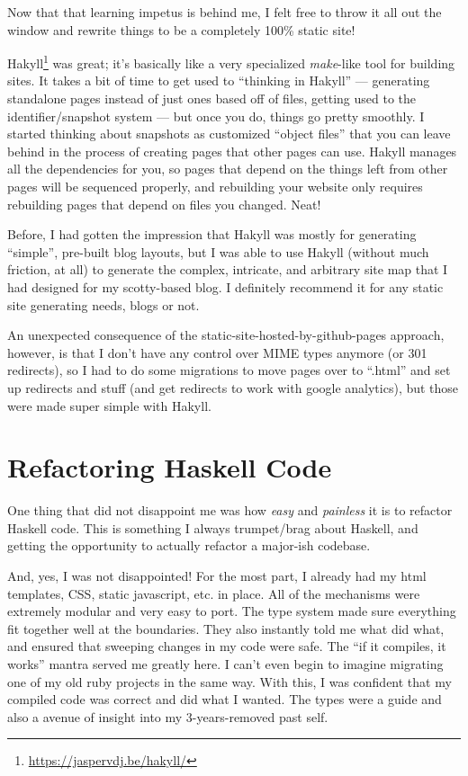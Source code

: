 \documentclass[]{article}
\renewcommand{\href}[2]{#2\footnote{\url{#1}}}
\begin{document}
Now that that learning impetus is behind me, I felt free to throw it all
out the window and rewrite things to be a completely 100\% static site!

\href{https://jaspervdj.be/hakyll/}{Hakyll} was great; it's basically
like a very specialized \emph{make}-like tool for building sites. It
takes a bit of time to get used to ``thinking in Hakyll'' --- generating
standalone pages instead of just ones based off of files, getting used
to the identifier/snapshot system --- but once you do, things go pretty
smoothly. I started thinking about snapshots as customized ``object
files'' that you can leave behind in the process of creating pages that
other pages can use. Hakyll manages all the dependencies for you, so
pages that depend on the things left from other pages will be sequenced
properly, and rebuilding your website only requires rebuilding pages
that depend on files you changed. Neat!

Before, I had gotten the impression that Hakyll was mostly for
generating ``simple'', pre-built blog layouts, but I was able to use
Hakyll (without much friction, at all) to generate the complex,
intricate, and arbitrary site map that I had designed for my
scotty-based blog. I definitely recommend it for any static site
generating needs, blogs or not.

An unexpected consequence of the static-site-hosted-by-github-pages
approach, however, is that I don't have any control over MIME types
anymore (or 301 redirects), so I had to do some migrations to move pages
over to ``.html'' and set up redirects and stuff (and get redirects to
work with google analytics), but those were made super simple with
Hakyll.

\section{Refactoring Haskell Code}\label{refactoring-haskell-code}

One thing that did not disappoint me was how \emph{easy} and
\emph{painless} it is to refactor Haskell code. This is something I
always trumpet/brag about Haskell, and getting the opportunity to
actually refactor a major-ish codebase.

And, yes, I was not disappointed! For the most part, I already had my
html templates, CSS, static javascript, etc. in place. All of the
mechanisms were extremely modular and very easy to port. The type system
made sure everything fit together well at the boundaries. They also
instantly told me what did what, and ensured that sweeping changes in my
code were safe. The ``if it compiles, it works'' mantra served me
greatly here. I can't even begin to imagine migrating one of my old ruby
projects in the same way. With this, I was confident that my compiled
code was correct and did what I wanted. The types were a guide and also
a avenue of insight into my 3-years-removed past self.
\end{document}
